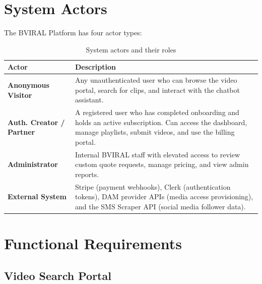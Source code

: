 \section{System Actors}

The BVIRAL Platform has four actor types:

\begin{table}[H]
\centering
\caption{System actors and their roles}
\begin{tabularx}{\textwidth}{lX}
\toprule
\textbf{Actor} & \textbf{Description} \\
\midrule
\textbf{Anonymous Visitor} & Any unauthenticated user who can browse the video portal, search
  for clips, and interact with the chatbot assistant. \\[0.4em]
\textbf{Auth. Creator / Partner} & A registered user who has completed onboarding and holds an
  active subscription. Can access the dashboard, manage playlists, submit videos, and use
  the billing portal. \\[0.4em]
\textbf{Administrator} & Internal BVIRAL staff with elevated access to review custom quote
  requests, manage pricing, and view admin reports. \\[0.4em]
\textbf{External System} & Stripe (payment webhooks), Clerk (authentication tokens), DAM
  provider APIs (media access provisioning), and the SMS Scraper API (social media follower data). \\
\bottomrule
\end{tabularx}
\end{table}

\section{Functional Requirements}

\subsection{Video Search Portal}

